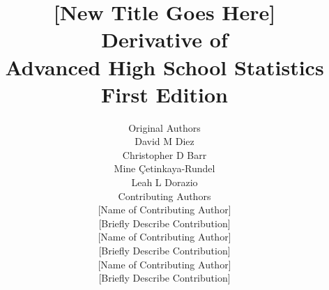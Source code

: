 

\title{\huge [New Title Goes Here] \\[2mm]
\large Derivative of \\
Advanced High School Statistics \\
First Edition}
\author{\Large Original Authors \\[1.5mm]
\normalsize David M Diez \\
\normalsize Christopher D Barr \\
\normalsize Mine \c{C}etinkaya-Rundel \\
\normalsize Leah L Dorazio \\[8mm]
\Large Contributing Authors \\[1.5mm]
\normalsize [Name of Contributing Author] \\
\small [Briefly Describe Contribution] \\[2mm]
\normalsize [Name of Contributing Author] \\
\small [Briefly Describe Contribution] \\[2mm]
\normalsize [Name of Contributing Author] \\
\small [Briefly Describe Contribution] \\[2mm]
}


